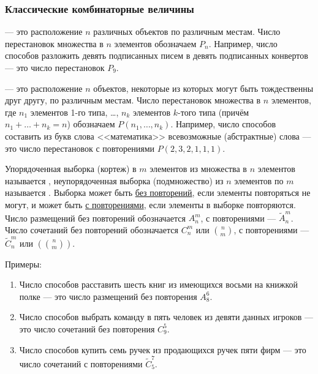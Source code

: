 	\subsubsection{Классические комбинаторные величины}
	
	 --- это расположение $n$ различных объектов по различным местам.
	Число перестановок множества в $n$ элементов обозначаем $P_n$. Например, число способов разложить девять подписанных писем в девять подписанных конвертов --- это число перестановок $P_9$.
	
	
	 --- это расположение $n$ объектов, некоторые из которых могут быть тождественны друг другу, по различным местам.
	Число перестановок множества в $n$ элементов, где $n_1$ элементов 1-го типа, \ldots, $n_k$ элементов $k$-того типа (причём $n_1+\ldots+n_k=n$) обозначаем $P(n_1, \ldots, n_k)$. Например, число способов составить из букв слова <<математика>> всевозможные (абстрактные) слова --- это число перестановок с повторениями $P(2,3,2,1,1,1)$.
	
	Упорядоченная выборка (кортеж) в $m$ элементов из множества в $n$ элементов называется , неупорядоченная выборка (подмножество) из $n$ элементов по $m$ называется .
	Выборка может быть \underline{без повторений}, если элементы повторяться не могут, и может быть \underline{с повторениями}, если элементы в выборке повторяются. 
	Число размещений без повторений обозначается $A_n^m$, с повторениями --- $\widetilde{A}_n^m$.
	Число сочетаний без повторений обозначается $C_n^m$ или $\binom{n}{m}$, с повторениями --- $\widetilde{C}_n^m$ или $\left(\binom{n}{m}\right)$.
	
	Примеры:
	\begin{enumerate}
		\item Число способов расставить шесть книг из имеющихся восьми на книжкой полке --- это число размещений без повторения $A_{8}^{6}$.
		\item Число способов выбрать команду в пять человек из девяти данных игроков --- это число сочетаний без повторения $C_9^5$.
		\item Число способов купить семь ручек из продающихся ручек пяти фирм --- это число сочетаний с повторениями $\widetilde{C}_5^7$.
	\end{enumerate}
	
